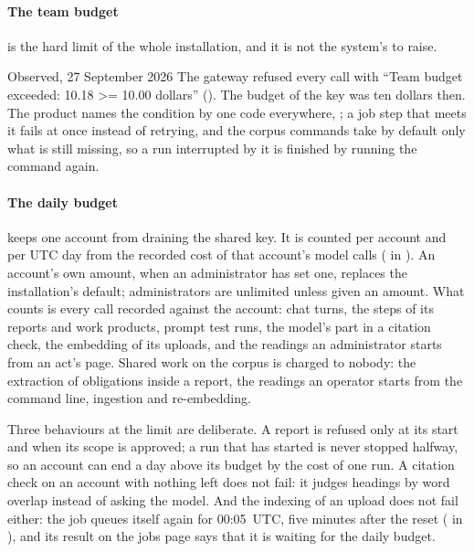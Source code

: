 \paragraph{The team budget} is the hard limit of the whole installation, and it is not the
system's to raise.

\begin{lessonbox}{Observed, 27 September 2026}
The gateway refused every call with \enquote{Team budget exceeded: 10.18 >= 10.00 dollars}
(). The budget of the key was ten dollars then. The product names
the condition by one code everywhere, ; a job step that meets it
fails at once instead of retrying, and the corpus commands take by default only what is still
missing, so a run interrupted by it is finished by running the command again.
\end{lessonbox}

\paragraph{The daily budget} keeps one account from draining the shared key. It is counted
per account and per UTC day from the recorded cost of that account's model calls
( in ). An account's own amount, when an
administrator has set one, replaces the installation's default; administrators are unlimited
unless given an amount. What counts is every call recorded against the account: chat turns,
the steps of its reports and work products, prompt test runs, the model's part in a citation
check, the embedding of its uploads, and the readings an administrator starts from an act's
page. Shared work on the corpus is charged to nobody: the extraction of obligations inside a
report, the readings an operator starts from the command line, ingestion and re-embedding.

Three behaviours at the limit are deliberate. A report is refused only at its start and when
its scope is approved; a run that has started is never stopped halfway, so an account can end
a day above its budget by the cost of one run. A citation check on an account with nothing
left does not fail: it judges headings by word overlap instead of asking the model. And the
indexing of an upload does not fail either: the  job queues itself
again for 00:05~UTC, five minutes after the reset ( in
), and its result on the jobs page says that it is waiting for
the daily budget.

